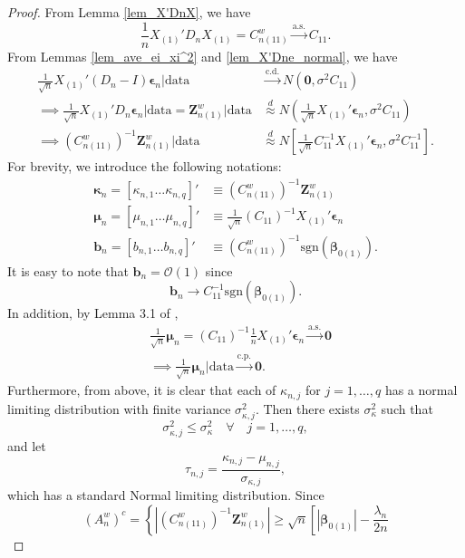 \documentclass[12pt]{article}
\newcommand{\be}{\bm{\beta}} %
\newcommand{\ep}{\bm{\epsilon}} %
\newcommand{\dn}{\frac{1}{n}} %
\newcommand{\dqn}{\frac{1}{\sqrt{n}}} %
\newcommand{\CONV}[1]{\stackrel{\text{#1}}{\longrightarrow}} %
\newcommand{\cnwa}{C_{n(11)}^w}
\newcommand{\znwa}{\bm{Z}_{n(1)}^w}
\begin{document}
\begin{proof}
	From Lemma \ref{lem_X'DnX}, we have 
	$$
	\dn X_{(1)}' D_n X_{(1)} = \cnwa \CONV{a.s.} C_{11}.
	$$
	From Lemmas \ref{lem_ave_ei_xi^2} and \ref{lem_X'Dne_normal}, we have
	\begin{align*}
		\dqn X_{(1)}' (D_n - I) \ep_n 
		\bigg| \text{data} 
		&\CONV{c.d.} 
		N \left( \bm{0}, \sigma^2 C_{11} \right) \\
		\implies \dqn X_{(1)}' D_n \ep_n
		\bigg| \text{data} 
		= \znwa \big| \text{data}
		&\stackrel{d}{\approx}
		N \left( \dqn X_{(1)}' \ep_n , \sigma^2 C_{11} \right) \\
		\implies \left( \cnwa \right)^{-1} \znwa 
		\bigg| \text{data}
		&\stackrel{d}{\approx}
		N \left[ 
				\dqn C_{11}^{-1} X_{(1)}' \ep_n 
				, \sigma^2 C_{11}^{-1} 
		  \right].
	\end{align*}
	For brevity, we introduce the following notations:
	\begin{align*}
		\bm{\kappa}_n = \left[ \kappa_{n,1} \ldots \kappa_{n,q} \right]'
		&\equiv \left( \cnwa \right)^{-1} \znwa \\
		\bm{\mu}_n = \left[ \mu_{n,1} \ldots \mu_{n,q} \right]' 
		&\equiv \dqn \left( C_{11} \right)^{-1} X_{(1)}' \ep_n \\
		\bm{b}_n = \left[ b_{n,1} \ldots b_{n,q} \right]'
		&\equiv \left( \cnwa \right)^{-1} 
				\text{sgn} \left( \be_{0(1)} \right).
	\end{align*}
	It is easy to note that $\bm{b}_n = \mathcal{O}(1)$ since
	$$
	\bm{b}_n \to C_{11}^{-1} \text{sgn} \left( \be_{0(1)} \right). 
	$$
	In addition, by Lemma 3.1 of \citet{Chatterjee&Lahiri}, 
	\begin{align*}
		&\dqn \bm{\mu}_n
		= \left( C_{11} \right)^{-1} \dn X_{(1)}' \ep_n 
		\CONV{a.s.} \bm{0} \\
		&\implies \dqn \bm{\mu}_n \bigg| \text{data}
		\CONV{c.p.} \bm{0}.
	\end{align*}
	Furthermore, from above, it is clear that each of $\kappa_{n,j}$ for $j = 1, \ldots, q$ has a normal limiting distribution with finite variance $\sigma^2_{\kappa,j}$. Then there exists $\sigma^2_{\kappa}$ such that 
	$$
	\sigma^2_{\kappa,j} \leq \sigma^2_{\kappa} 
	\quad \forall \quad j = 1, \ldots, q, 
	$$ 
	and let 
	$$
	\tau_{n,j} = \dfrac{ \kappa_{n,j} - \mu_{n,j} }{ \sigma_{\kappa,j} },
	$$
	which has a standard Normal limiting distribution. Since
	$$
	\left(A_n^w \right)^c = 
	\left\{
		\left|
			\left( \cnwa \right)^{-1} \znwa 
		\right| 
	\geq \sqrt{n}
	  \left[
			\left| \be_{0(1)} \right|
			- \dfrac{\lambda_n}{2n} 
$$
\end{proof}
\end{document}
